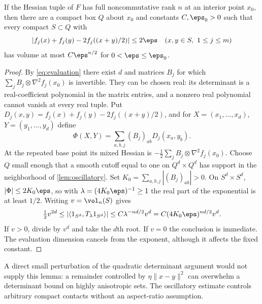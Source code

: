 \begin{lemma}\label{lem:smooth-volume}
If the Hessian tuple of $F$ has full noncommutative rank $n$ at an
interior point $x_0$, then there are a compact box $Q$ about $x_0$ and
constants $C,\eps_0>0$ such that every compact $S\subset Q$ with
\[
 |f_j(x)+f_j(y)-2f_j((x+y)/2)|\le2\eps
 \quad(x,y\in S,\ 1\le j\le m)
\]
has volume at most $C\eps^{n/2}$ for $0<\eps\le\eps_0$.
\end{lemma}
\begin{proof}
By \eqref{eq:evaluation} there exist $d$ and matrices $B_j$ for which
$\sum_j B_j\otimes\nabla^2f_j(x_0)$ is invertible. They can be chosen
real: its determinant is a real-coefficient polynomial in the matrix
entries, and a nonzero real polynomial cannot vanish at every real
tuple. Put $D_j(x,y)=f_j(x)+f_j(y)-2f_j((x+y)/2)$, and for
$X=(x_1,\ldots,x_d)$, $Y=(y_1,\ldots,y_d)$ define
\[
 \Phi(X,Y)=\sum_{a,b,j}(B_j)_{ab}D_j(x_a,y_b).
\]
At the repeated base point its mixed Hessian is
$-\tfrac12\sum_jB_j\otimes\nabla^2f_j(x_0)$.
Choose $Q$ small enough that a smooth cutoff equal to one on
$Q^d\times Q^d$ has support in the neighborhood of
\cref{lem:oscillatory}. Set $K_0=\sum_{a,b,j}|(B_j)_{ab}|>0$.
On $S^d\times S^d$, $|\Phi|\le2K_0\eps$, so with
$\lambda=(4K_0\eps)^{-1}\ge1$ the real part of the exponential is
at least $1/2$. Writing $v=\vol_n(S)$ gives
\[
 \tfrac12v^{2d}
 \le\left|\langle 1_{S^d},T_\lambda1_{S^d}\rangle\right|
 \le C\lambda^{-nd/2}v^d
 =C(4K_0\eps)^{nd/2}v^d.
\]
If $v>0$, divide by $v^d$ and take the $d$th root. If $v=0$ the
conclusion is immediate. The evaluation dimension cancels from the
exponent, although it affects the fixed constant.
\end{proof}

A direct small perturbation of the quadratic determinant argument would
not supply this lemma: a remainder controlled by
$\eta\|x-y\|^2$ can overwhelm a determinant bound on highly anisotropic
sets. The oscillatory estimate controls arbitrary compact contacts
without an aspect-ratio assumption.

